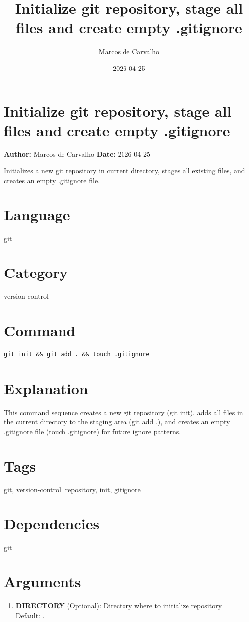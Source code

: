 \documentclass{article}
\title{Initialize git repository, stage all files and create empty .gitignore}
\author{Marcos de Carvalho}
\date{2026-04-25}
\begin{document}
\section*{Initialize git repository, stage all files and create empty .gitignore}
\textbf{Author:} Marcos de Carvalho \hfill \textbf{Date:} 2026-04-25

\noindent Initializes a new git repository in current directory, stages all existing files, and creates an empty .gitignore file.

\section*{Language}
git

\section*{Category}
version-control

\section*{Command}
\begin{lstlisting}
git init && git add . && touch .gitignore
\end{lstlisting}

\section*{Explanation}
This command sequence creates a new git repository (git init), adds all files in the current directory to the staging area (git add .), and creates an empty .gitignore file (touch .gitignore) for future ignore patterns.

\section*{Tags}
git, version-control, repository, init, gitignore

\section*{Dependencies}
git


\section*{Arguments}
\begin{enumerate}
  \item \textbf{DIRECTORY} (Optional): Directory where to initialize repository \\ Default: .
\end{enumerate}
\end{document}
